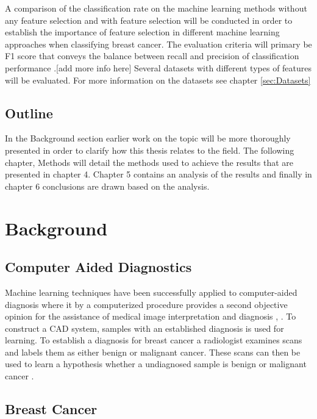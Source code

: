 \documentclass{kththesis}
\begin{document}
A comparison of the classification rate on the machine learning methods without any feature selection and with feature selection will be conducted in order to establish the importance of feature selection in different machine learning approaches when classifying breast cancer. The evaluation criteria will primary be F1 score that conveys the balance between recall and precision of classification performance \parencite{muc1992}.[add more info here] Several datasets with different types of features will be evaluated. For more information on the datasets see chapter \ref{sec:Datasets}

\section{Outline}

In the Background section earlier work on the topic will be more thoroughly presented in order to clarify how this thesis relates to the field. The following chapter, Methods will detail the methods used to achieve the results that are presented in chapter 4. Chapter 5 contains an analysis of the results and finally in chapter 6 conclusions are drawn based on the analysis.

\chapter{Background}

\section{Computer Aided Diagnostics}

Machine learning techniques have been successfully applied to computer-aided diagnosis where it by a computerized procedure provides a second objective opinion for the assistance of medical image interpretation and diagnosis \parencite{li2007}, \parencite{ni2016}. To construct a CAD system, samples with an established diagnosis is used for learning. To establish a diagnosis for breast cancer a radiologist examines scans and labels them as either benign or malignant cancer. These scans can then be used to learn a hypothesis whether a undiagnosed sample is benign or malignant cancer \parencite{li2007}.

\section{Breast Cancer} %
\end{document}
